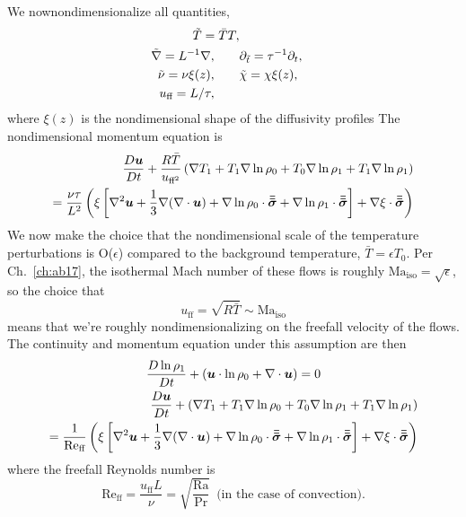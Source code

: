 We nownondimensionalize all quantities, 
\begin{equation}
\begin{split}
\td{T} =  \bar{T} T, \\
\td{\grad} = L^{-1}\grad,  		\qquad &\partial_{\td{t}} = \tau^{-1}\partial_t, \\
\td{\nu} = \nu\xi(z),				\qquad &\td{\chi} = \chi\xi(z),\\
u_{\ff} = L/\tau, \qquad &%
\end{split}
\end{equation}
where $\xi(z)$ is the nondimensional shape of the diffusivity profiles
The nondimensional momentum equation is
\begin{equation}
\begin{split}
\frac{D \bm{u}}{Dt} + \frac{ R \bar{T}}{u_{\text{ff}^2}} \left( \nabla T_1 + T_1 \nabla \ln\rho_0 + T_0 \nabla \ln\rho_1 + T_1 \nabla\ln\rho_1\right)
\\
= \frac{\nu \tau}{L^2}\left( \xi\left[\nabla^2\bm{u} + \frac{1}{3}\nabla(\nabla\cdot\bm{u}) + \nabla\ln\rho_0\cdot\bm{\bar{\bar{\sigma}}} + \nabla\ln\rho_1\cdot\bm{\bar{\bar{\sigma}}}\right] + \nabla\xi\cdot\bm{\bar{\bar{\sigma}}}\right)
\end{split}
\end{equation}
We now make the choice that the nondimensional scale of the temperature perturbations is O($\epsilon$) compared to the background temperature, $\bar{T} = \epsilon T_0$.
Per Ch.~\ref{ch:ab17}, the isothermal Mach number of these flows is roughly $\text{Ma}_{\text{iso}} = \sqrt{\epsilon}$, so the choice that
$$
u_{\text{ff}}= \sqrt{R \bar{T}} \sim \text{Ma}_{\text{iso}} 
$$
means that we're roughly nondimensionalizing on the freefall velocity of the flows.
The continuity and momentum equation under this assumption are then
\begin{gather}
\frac{D \ln\rho_1}{Dt} + (\bm{u}\cdot\ln\rho_0 + \nabla\cdot\bm{u}) = 0 \\
\begin{split}
\frac{D \bm{u}}{Dt} + \left( \nabla T_1 + T_1 \nabla \ln\rho_0 + T_0 \nabla \ln\rho_1 + T_1 \nabla\ln\rho_1\right)
\\
= \frac{1}{\text{Re}_{\text{ff}}}\left( \xi\left[\nabla^2\bm{u} + \frac{1}{3}\nabla(\nabla\cdot\bm{u}) + \nabla\ln\rho_0\cdot\bm{\bar{\bar{\sigma}}} + \nabla\ln\rho_1\cdot\bm{\bar{\bar{\sigma}}}\right] + \nabla\xi\cdot\bm{\bar{\bar{\sigma}}}\right)
\end{split}
\end{gather}
where the freefall Reynolds number is
$$
\text{Re}_{\text{ff}} = \frac{u_{\text{ff}} L}{\nu} = \sqrt{\frac{\text{Ra}}{\text{Pr}}}\,\,\,\text{(in the case of convection)}.
$$
